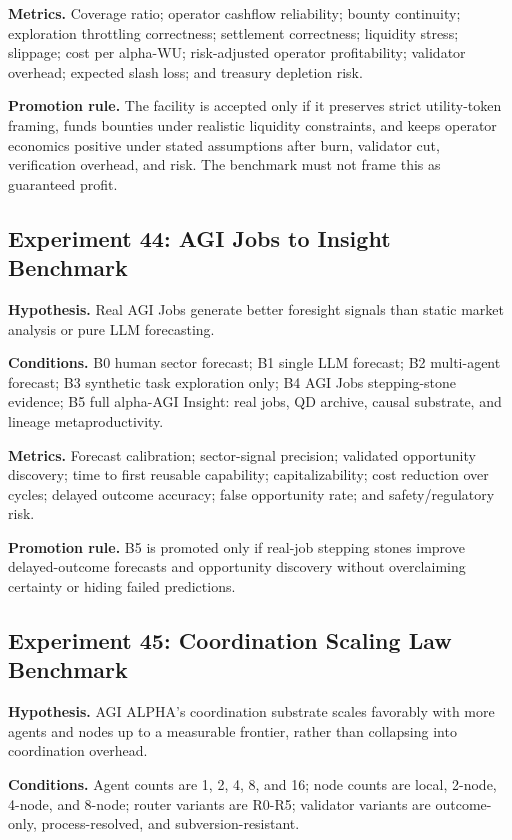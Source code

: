 \textbf{Metrics.} Coverage ratio; operator cashflow reliability; bounty
continuity; exploration throttling correctness; settlement correctness;
liquidity stress; slippage; cost per alpha-WU; risk-adjusted operator
profitability; validator overhead; expected slash loss; and treasury
depletion risk.

\textbf{Promotion rule.} The facility is accepted only if it preserves
strict utility-token framing, funds bounties under realistic liquidity
constraints, and keeps operator economics positive under stated
assumptions after burn, validator cut, verification overhead, and risk.
The benchmark must not frame this as guaranteed profit.

\subsection{Experiment 44: AGI Jobs to Insight
Benchmark}\label{experiment-44-agi-jobs-to-insight-benchmark}

\textbf{Hypothesis.} Real AGI Jobs generate better foresight signals
than static market analysis or pure LLM forecasting.

\textbf{Conditions.} B0 human sector forecast; B1 single LLM forecast;
B2 multi-agent forecast; B3 synthetic task exploration only; B4 AGI Jobs
stepping-stone evidence; B5 full alpha-AGI Insight: real jobs, QD
archive, causal substrate, and lineage metaproductivity.

\textbf{Metrics.} Forecast calibration; sector-signal precision;
validated opportunity discovery; time to first reusable capability;
capitalizability; cost reduction over cycles; delayed outcome accuracy;
false opportunity rate; and safety/regulatory risk.

\textbf{Promotion rule.} B5 is promoted only if real-job stepping stones
improve delayed-outcome forecasts and opportunity discovery without
overclaiming certainty or hiding failed predictions.

\subsection{Experiment 45: Coordination Scaling Law
Benchmark}\label{experiment-45-coordination-scaling-law-benchmark}

\textbf{Hypothesis.} AGI ALPHA's coordination substrate scales favorably
with more agents and nodes up to a measurable frontier, rather than
collapsing into coordination overhead.

\textbf{Conditions.} Agent counts are 1, 2, 4, 8, and 16; node counts
are local, 2-node, 4-node, and 8-node; router variants are R0-R5;
validator variants are outcome-only, process-resolved, and
subversion-resistant.

